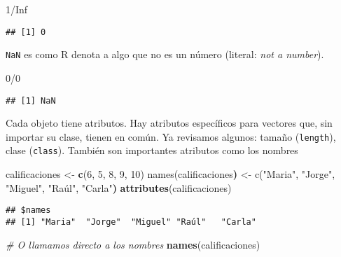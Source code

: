 \documentclass[]{article}
\newenvironment{Shaded}{\begin{snugshade}}{\end{snugshade}}
\newcommand{\KeywordTok}[1]{\textcolor[rgb]{0.13,0.29,0.53}{\textbf{{#1}}}}
\newcommand{\DecValTok}[1]{\textcolor[rgb]{0.00,0.00,0.81}{{#1}}}
\newcommand{\StringTok}[1]{\textcolor[rgb]{0.31,0.60,0.02}{{#1}}}
\newcommand{\CommentTok}[1]{\textcolor[rgb]{0.56,0.35,0.01}{\textit{{#1}}}}
\newcommand{\OtherTok}[1]{\textcolor[rgb]{0.56,0.35,0.01}{{#1}}}
\newcommand{\ErrorTok}[1]{\textbf{{#1}}}
\newcommand{\NormalTok}[1]{{#1}}
\begin{document}
\begin{Shaded}
\begin{Highlighting}[]
\DecValTok{1}\NormalTok{/}\OtherTok{Inf}
\end{Highlighting}
\end{Shaded}

\begin{verbatim}
## [1] 0
\end{verbatim}

\texttt{NaN} es como R denota a algo que no es un número (literal:
\emph{not a number}).

\begin{Shaded}
\begin{Highlighting}[]
\DecValTok{0}\NormalTok{/}\DecValTok{0}
\end{Highlighting}
\end{Shaded}

\begin{verbatim}
## [1] NaN
\end{verbatim}

Cada objeto tiene atributos. Hay atributos específicos para vectores
que, sin importar su clase, tienen en común. Ya revisamos algunos:
tamaño (\texttt{length}), clase (\texttt{class}). También son
importantes atributos como los nombres

\begin{Shaded}
\begin{Highlighting}[]
\NormalTok{calificaciones <-}\StringTok{ }\KeywordTok{c}\NormalTok{(}\DecValTok{6}\NormalTok{, }\DecValTok{5}\NormalTok{, }\DecValTok{8}\NormalTok{, }\DecValTok{9}\NormalTok{, }\DecValTok{10}\NormalTok{)}
\NormalTok{names(calificaciones}\ErrorTok{)} \NormalTok{<- c(}\StringTok{"Maria"}\NormalTok{, }\StringTok{"Jorge"}\NormalTok{, }\StringTok{"Miguel"}\NormalTok{, }\StringTok{"Raúl"}\NormalTok{, }\StringTok{"Carla"}\ErrorTok{)}
\KeywordTok{attributes}\NormalTok{(calificaciones)}
\end{Highlighting}
\end{Shaded}

\begin{verbatim}
## $names
## [1] "Maria"  "Jorge"  "Miguel" "Raúl"   "Carla"
\end{verbatim}

\begin{Shaded}
\begin{Highlighting}[]
\CommentTok{# O llamamos directo a los nombres}
\KeywordTok{names}\NormalTok{(calificaciones)}
\end{Highlighting}
\end{Shaded}
\end{document}
